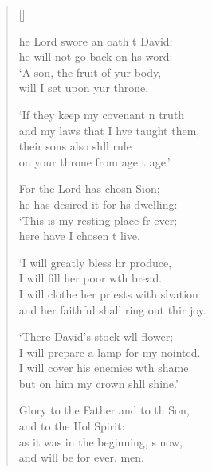 \settowidth{\versewidth}{I will clothe her priests with salvation *}
\begin{verse}[\versewidth]
  \begin{patverse}
he Lord swore an oath t David;\Med\\
    he will not go back on h\pointup{\i}s word:\\
‘A son, the fruit of yur body,\Med\\
    will I set upon yur throne.

‘If they keep my covenant \pointup{\i}n truth\Med\\
    and my laws that I hve taught them,\\
their sons also shll rule\Med\\
    on your throne from age t age.’

For the Lord has chosn Sion;\Med\\
    he has desired it for h\pointup{\i}s dwelling:\\
‘This is my resting-place fr ever;\Med\\
    here have I chosen t live.

‘I will greatly bless hr produce,\Med\\
    I will fill her poor w\pointup{\i}th bread.\\
I will clothe her priests with slvation\Med\\
    and her faithful shall ring out thir joy.

‘There David’s stock w\pointup{\i}ll flower;\Med\\
    I will prepare a lamp for my nointed.\\
I will cover his enemies w\pointup{\i}th shame\Med\\
    but on him my crown shll shine.’

Glory to the Father and to th Son,\Med\\
    and to the Hol Spirit:\\
as it was in the beginning, \pointup{\i}s now,\Med\\
    and will be for ever. men.
  \end{patverse}
\end{verse}
